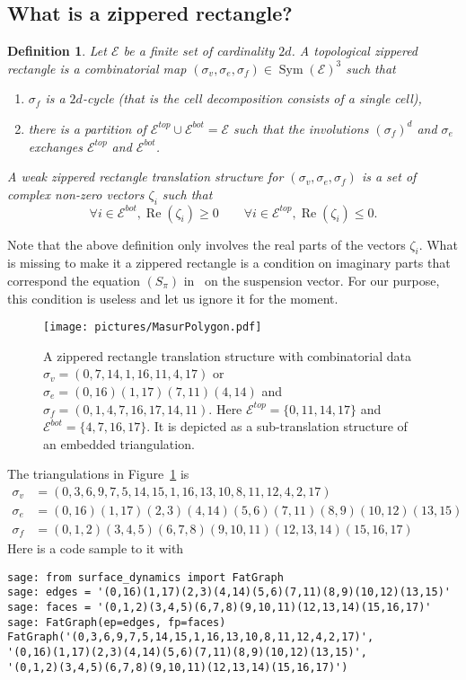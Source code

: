 \documentclass{article}
\def\cE{\mathcal{E}}
\def\Re{\operatorname{Re}}
\def\Sym{\operatorname{Sym}}
\newtheorem{definition}{Definition}
\begin{document}
\subsection{What is a zippered rectangle?}
\begin{definition}
\label{def:WeakZipperedRectangle}
Let $\cE$ be a finite set of cardinality $2d$.
A \emph{topological zippered rectangle} is a combinatorial map $(\sigma_v, \sigma_e, \sigma_f) \in \Sym(\cE)^3$ such that
\begin{enumerate}
\item $\sigma_f$ is a $2d$-cycle (that is the cell decomposition consists of a single cell),
\item there is a partition of $\cE^{top} \cup \cE^{bot} = \cE$ such that the 
involutions $(\sigma_f)^d$ and $\sigma_e$ exchanges $\cE^{top}$ and $\cE^{bot}$.
\end{enumerate}
A \emph{weak zippered rectangle translation structure} for $(\sigma_v, \sigma_e, \sigma_f)$ is
a set of complex non-zero vectors $\zeta_i$ such that
\[
\forall i \in \cE^{bot}, \Re(\zeta_i) \geq 0
\qquad
\forall i \in \cE^{top}, \Re(\zeta_i) \leq 0.
\]
\end{definition}
Note that the above definition only involves the real parts of the vectors $\zeta_i$.
What is missing to make it a zippered rectangle is a condition on imaginary parts
that correspond the equation $(S_\pi)$ in~\cite{Yoccoz} on the suspension vector. For
our purpose, this condition is useless and let us ignore it for the moment.
\begin{figure}[!ht]
\begin{center}\texttt{[image: pictures/MasurPolygon.pdf]}\end{center}
\caption{A zippered rectangle translation structure with combinatorial data
$\sigma_v = (0,7,14,1,16,11,4,17)$ or
$\sigma_e = (0,16)(1,17)(7,11)(4,14)$ and
$\sigma_f = (0,1,4,7,16,17,14,11)$. Here $\cE^{top} = \{0,11,14,17\}$ and $\cE^{bot} = \{4,7,16,17\}$. It is depicted as a sub-translation structure of an embedded triangulation.}
\label{fig:TriangulationYoccoz}
\end{figure}

The triangulations in Figure~\ref{fig:TriangulationYoccoz} is
\begin{align*}
\sigma_v &= (0,3,6,9,7,5,14,15,1,16,13,10,8,11,12,4,2,17) \\
\sigma_e &= (0,16)(1,17)(2,3)(4,14)(5,6)(7,11)(8,9)(10,12)(13,15) \\
\sigma_f &= (0,1,2)(3,4,5)(6,7,8)(9,10,11)(12,13,14)(15,16,17)
\end{align*}
Here is a code sample to it with \cite{surface-dynamics}
\begin{verbatim}
sage: from surface_dynamics import FatGraph
sage: edges = '(0,16)(1,17)(2,3)(4,14)(5,6)(7,11)(8,9)(10,12)(13,15)'
sage: faces = '(0,1,2)(3,4,5)(6,7,8)(9,10,11)(12,13,14)(15,16,17)'
sage: FatGraph(ep=edges, fp=faces)
FatGraph('(0,3,6,9,7,5,14,15,1,16,13,10,8,11,12,4,2,17)',
'(0,16)(1,17)(2,3)(4,14)(5,6)(7,11)(8,9)(10,12)(13,15)', 
'(0,1,2)(3,4,5)(6,7,8)(9,10,11)(12,13,14)(15,16,17)')
\end{verbatim}
\end{document}
